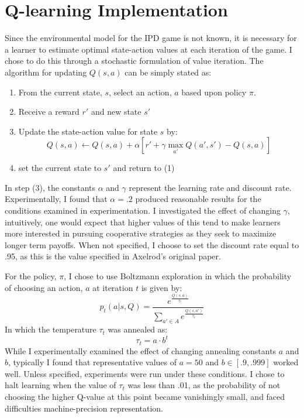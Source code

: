 \documentclass[12pt]{amsart}
\newcommand{\0}{\mat{0}}
\newcommand{\1}{\mathds{1}}
\begin{document}
\section{Q-learning Implementation}
Since the environmental model for the IPD game is not known, it is necessary for a learner to estimate optimal state-action values at each iteration of the game.  I chose to do this through a stochastic formulation of value iteration.  The algorithm for updating $Q(s,a)$ can be simply stated as:
\begin{enumerate}
\vspace{.5 cm}
\item From the current state, $s$, select an action, $a$ based upon policy $\pi$.
\item Receive a reward $r'$ and new state $s'$
\item Update the state-action value for state $s$ by:
$$
Q(s,a) \leftarrow Q(s,a) + \alpha[r' + \gamma \max_{a'} Q(a',s') - Q(s,a)]
$$
\item set the current state to $s'$ and return to (1)
\end{enumerate}
In step (3), the constants $\alpha$ and $\gamma$ represent the learning rate and discount rate.  Experimentally, I found that $\alpha =.2$ produced reasonable results for the conditions examined in experimentation.  I investigated the effect of changing $\gamma$, intuitively, one would expect that higher values of this tend to make learners more interested in pursuing cooperative strategies as they seek to maximize longer term payoffs.  When not specified, I choose to set the discount rate equal to .95, as this is the value specified in Axelrod's original paper.
 \vspace{.5 cm}

For the policy, $\pi$, I chose to use Boltzmann exploration in which the probability of choosing an action, $a$ at iteration $t$ is given by:
$$
p_t(a|s,Q) = \frac {e^{\frac {Q(s,a)}{\tau_t}}} {\sum_{a' \in A}e^{\frac{Q(s,a')}{\tau_t}}}
$$
In which the temperature $\tau_t$ was annealed as:
$$
\tau_t = a \cdot b^t
$$
While I experimentally examined the effect of changing annealing constants $a$ and $b$, typically I found that representative values of $a=50$ and $b \in [.9, .999]$ worked well.  Unless specified, experiments were run under these conditions.  I chose to halt learning when the value of $\tau_t$ was less than .01, as the probability of not choosing the higher Q-value at this point became vanishingly small, and faced difficulties machine-precision representation. 
\end{document}
